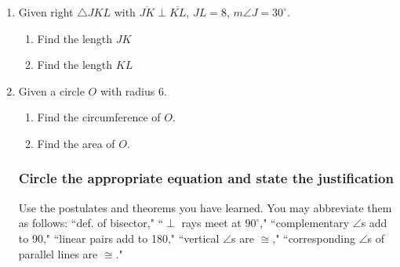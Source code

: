 \documentclass[12pt, oneside]{article}
\begin{document}
\begin{enumerate}
  \item Given right $\triangle JKL$ with $\overline{JK} \perp \overline{KL}$, $JL=8$, $m\angle J=30^\circ$.
    \begin{center}
       \vspace{1cm}
    \end{center}
    \begin{enumerate}
      \item Find the length $JK$\\[2cm]
      \item Find the length $KL$\\[2cm]
    \end{enumerate}

  \item Given a circle $O$ with radius $6$.
  \begin{enumerate}
    \item Find the circumference of $O$. \vspace{2cm}
    \item Find the area of $O$. \vspace{2cm}
  \end{enumerate}

\newpage
\subsubsection*{Circle the appropriate equation and state the justification}
Use the postulates and theorems you have learned. You may abbreviate them as follows: ``def. of bisector," ``$\perp$ rays meet at $90^\circ$," ``complementary $\angle$s add to 90," ``linear pairs add to 180," ``vertical $\angle$s are $\cong$," ``corresponding $\angle$s of parallel lines are $\cong$."



\end{enumerate}
\end{document}

